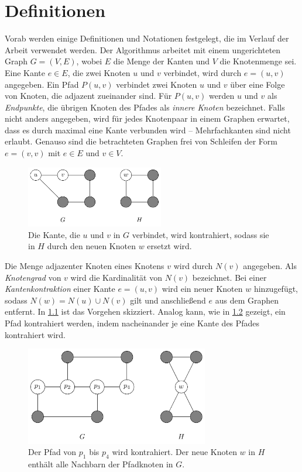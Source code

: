 \chapter{Definitionen}
\label{cha:definitionen}

Vorab werden einige Definitionen und Notationen festgelegt, die im Verlauf der Arbeit verwendet werden.
Der Algorithmus arbeitet mit einem ungerichteten Graph $G = (V, E)$, wobei $E$ die Menge der Kanten und $V$ die Knotenmenge sei.
Eine Kante $e \in E$, die zwei Knoten $u$ und $v$ verbindet, wird durch $e = (u, v)$ angegeben.
Ein Pfad $P(u, v)$ verbindet zwei Knoten $u$ und $v$ über eine Folge von Knoten, die adjazent zueinander sind.
Für $P(u, v)$ werden $u$ und $v$ als \emph{Endpunkte}, die übrigen Knoten des Pfades als \emph{innere Knoten} bezeichnet.
Falls nicht anders angegeben, wird für jedes Knotenpaar in einem Graphen erwartet, dass es durch maximal eine Kante verbunden wird -- Mehrfachkanten sind nicht erlaubt.
Genauso sind die betrachteten Graphen frei von Schleifen der Form $e = (v, v)$ mit $e \in E$ und $v \in V$.
\begin{figure}
  \includegraphics[width=6cm]{bilder/Kantenkontraktion.pdf}
  \caption{Die Kante, die $u$ und $v$ in $G$ verbindet, wird kontrahiert, sodass sie in $H$ durch den neuen Knoten $w$ ersetzt wird.}
  \label{fig:Kantenkontraktion}
\end{figure}
Die Menge adjazenter Knoten eines Knotens $v$ wird durch $N(v)$ angegeben.
Als \emph{Knotengrad} von $v$ wird die Kardinalität von $N(v)$ bezeichnet.
Bei einer \emph{Kantenkontraktion} einer Kante $e = (u, v)$ wird ein neuer Knoten $w$ hinzugefügt, sodass $N(w) = N(u) \cup N(v)$ gilt und anschließend $e$ aus dem Graphen entfernt.
In \Abb \ref{fig:Kantenkontraktion} ist das Vorgehen skizziert.
Analog kann, wie in \Abb \ref{fig:Pfadkontraktion} gezeigt, ein Pfad kontrahiert werden, indem nacheinander je eine Kante des Pfades kontrahiert wird.
\begin{figure}[H]
  \centering
  \includegraphics[width=8cm]{bilder/Pfadkontraktion.pdf}
  \caption{Der Pfad von $p_1$ bis $p_4$ wird kontrahiert.
           Der neue Knoten $w$ in $H$ enthält alle Nachbarn der Pfadknoten in $G$.}
  \label{fig:Pfadkontraktion}
\end{figure}

